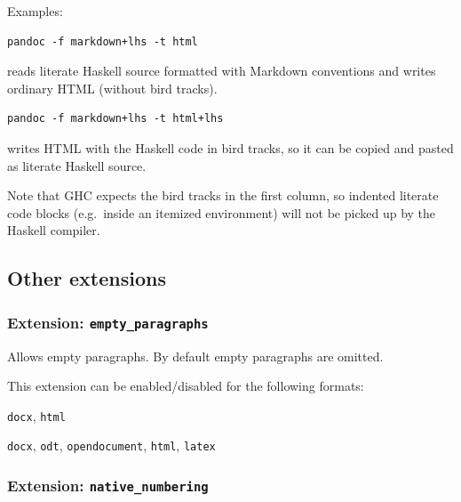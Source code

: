 \documentclass[
]{article}
\providecommand{\tightlist}{%
  \setlength{\itemsep}{0pt}\setlength{\parskip}{0pt}}
\begin{document}
Examples:

\begin{verbatim}
pandoc -f markdown+lhs -t html
\end{verbatim}

reads literate Haskell source formatted with Markdown conventions and
writes ordinary HTML (without bird tracks).

\begin{verbatim}
pandoc -f markdown+lhs -t html+lhs
\end{verbatim}

writes HTML with the Haskell code in bird tracks, so it can be copied
and pasted as literate Haskell source.

Note that GHC expects the bird tracks in the first column, so indented
literate code blocks (e.g.~inside an itemized environment) will not be
picked up by the Haskell compiler.

\hypertarget{other-extensions}{%
\subsection{Other extensions}\label{other-extensions}}

\hypertarget{extension-empty_paragraphs}{%
\subsubsection{\texorpdfstring{Extension:
\texttt{empty\_paragraphs}}{Extension: empty\_paragraphs}}\label{extension-empty_paragraphs}}

Allows empty paragraphs. By default empty paragraphs are omitted.

This extension can be enabled/disabled for the following formats:

\begin{description}
\tightlist
\item[input formats]
\texttt{docx}, \texttt{html}
\item[output formats]
\texttt{docx}, \texttt{odt}, \texttt{opendocument}, \texttt{html},
\texttt{latex}
\end{description}

\hypertarget{extension-native_numbering}{%
\subsubsection{\texorpdfstring{Extension:
\texttt{native\_numbering}}{Extension: native\_numbering}}\label{extension-native_numbering}}
\end{document}
